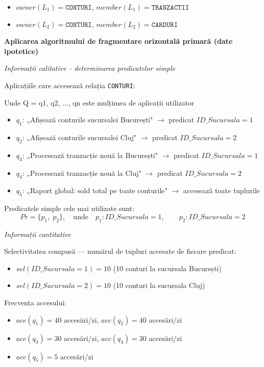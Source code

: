 \documentclass[12pt,a4paper]{article}
\begin{document}
\begin{itemize}
  \item $owner(L_1) = \texttt{CONTURI}$, \quad $member(L_1) = \texttt{TRANZACTII}$
  \item $owner(L_2) = \texttt{CONTURI}$, \quad $member(L_2) = \texttt{CARDURI}$
\end{itemize}

\textbf{Aplicarea algoritmului de fragmentare orizontală primară (date ipotetice)}

\textit{Informații calitative - determinarea predicatelor simple}

Aplicațiile care accesează relația \texttt{CONTURI}:

Unde Q = {q1, q2, ..., qn} este mulțimea de aplicații utilizator
\begin{itemize}
  \item $q_1$: „Afișează conturile sucursalei București" $\rightarrow$ predicat $ID\_Sucursala = 1$
  \item $q_2$: „Afișează conturile sucursalei Cluj" $\rightarrow$ predicat $ID\_Sucursala = 2$
  \item $q_3$: „Procesează tranzacție nouă la București" $\rightarrow$ predicat $ID\_Sucursala = 1$
  \item $q_4$: „Procesează tranzacție nouă la Cluj" $\rightarrow$ predicat $ID\_Sucursala = 2$
  \item $q_5$: „Raport global: sold total pe toate conturile" $\rightarrow$ accesează toate tuplurile
\end{itemize}

Predicatele simple cele mai utilizate sunt:
\[
  Pr = \{p_1,\; p_2\}, \quad \text{unde} \quad
  p_1: ID\_Sucursala = 1, \qquad p_2: ID\_Sucursala = 2
\]

\textit{Informații cantitative}

Selectivitatea compusă — numărul de tupluri accesate de fiecare predicat:
\begin{itemize}
  \item $sel(ID\_Sucursala = 1) = 10$ (10 conturi la sucursala București)
  \item $sel(ID\_Sucursala = 2) = 10$ (10 conturi la sucursala Cluj)
\end{itemize}

Frecvența accesului:
\begin{itemize}
  \item $acc(q_1) = 40$ accesări/zi, \quad $acc(q_2) = 40$ accesări/zi
  \item $acc(q_3) = 30$ accesări/zi, \quad $acc(q_4) = 30$ accesări/zi
  \item $acc(q_5) = 5$ accesări/zi
\end{itemize}
\end{document}

